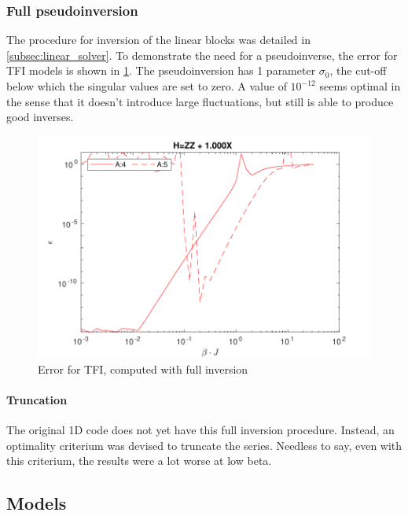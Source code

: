 \subsubsection{Full pseudoinversion}

The procedure for inversion of the linear blocks was detailed in \cref{subsec:linear_solver}. To demonstrate the need for a pseudoinverse, the error for \Gls{TFI} models is shown in \cref{benc:fig:fullinv}. The pseudoinversion has 1 parameter $\sigma_0$, the cut-off below which the singular values are set to zero. A value of $10^{-12}$ seems optimal in the sense that it doesn't introduce large fluctuations, but still is able to produce good inverses.

\begin{figure}[h!]
    \center
    \includegraphics[width=\textwidth]{Figuren/benchmarking/t_ising_full_inverse.pdf }
    \caption{Error for \Gls{TFI}, computed with full inversion }
    \label{benc:fig:fullinv}
\end{figure}

\paragraph{Truncation}

The original 1D code does not yet have this full inversion procedure. Instead, an optimality criterium was devised to truncate the series. Needless to say, even with this criterium, the results were a lot worse at low beta.

\subsection{Models}

